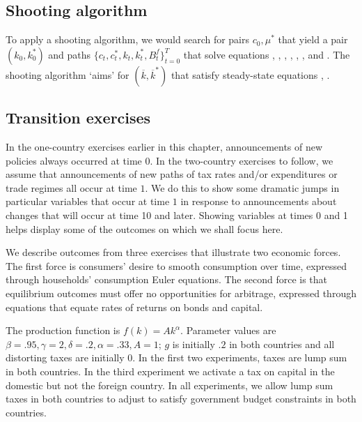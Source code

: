 \subsection{Shooting algorithm}

To apply a shooting algorithm, we would search for pairs $c_0, \mu^*$ that yield a pair $(k_0, k_0^*)$ and paths  $\{c_t, c_t^*, k_t, k_t^*, B_t^f\}_{t=0}^T$ that solve equations
, , , , ,
, and .  The shooting algorithm  `aims' for   $(\overline k, \overline k^*)$ that satisfy  steady-state
equations , .



\subsection{Transition exercises}

 In the one-country exercises  earlier in this chapter, announcements of new policies always occurred at time $0$.
In the two-country exercises to follow, we assume that announcements of new paths of tax rates and/or expenditures or trade
regimes all occur at time $1$.  We do this to show some dramatic jumps in  particular variables that occur at
time $1$ in response to announcements about changes that will occur at time 10 and later.  Showing variables at times 0 and
1 helps display some of the outcomes on which we shall  focus here.


 We describe outcomes from three exercises that illustrate  two
economic forces. The first force  is consumers' desire to smooth
consumption over time, expressed through  households' consumption Euler equations.
The second  force is that equilibrium outcomes must offer no opportunities for arbitrage, expressed through  equations that
equate rates of returns on bonds and capital.

\newpage

The production function is $f(k) = A k^\alpha$. Parameter values are $\beta=.95, \gamma =2, \delta = .2, \alpha = .33, A=1$;
 $g$ is initially
$.2$  in both countries and all distorting taxes are initially $0$.
In the first two experiments,  taxes are  lump sum in both countries.  In the third experiment we activate
a tax on capital in the domestic but not the foreign country.
In all experiments, we allow lump sum taxes in both countries  to adjust to satisfy government budget constraints in both countries.



